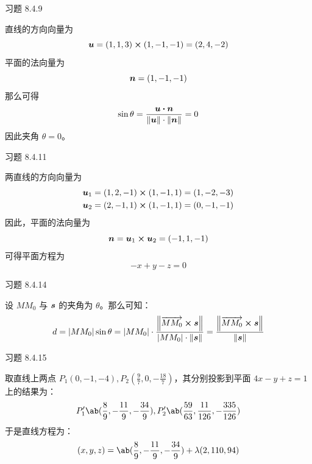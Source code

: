 \begin{problem}
	习题 8.4.9
	\begin{solution}
		直线的方向向量为
		$$
		\vect{u} = (1, 1, 3) \cp (1, -1, -1) = (2, 4, -2)
		$$
		平面的法向量为
		$$
		\boldsymbol{n} = (1, -1, -1)
		$$
		那么可得
		$$
		\sin \theta = \frac{\vect{u} \vdot \vect{n}}{\norm{\vect{u}} \cdot \norm{\vect{n}}} = 0
		$$
		因此夹角 $\theta = 0$。
	\end{solution}
\end{problem}

\begin{problem}
	习题 8.4.11
	\begin{solution}
		两直线的方向向量为
		$$
		\begin{gathered}
			\vect{u}_1 = (1, 2, -1) \cp (1, -1, 1) = (1, -2, -3) \\
			\vect{u}_2 = (2, -1, 1) \cp (1, -1, 1) = (0, -1, -1)
		\end{gathered}
		$$
		因此，平面的法向量为
		$$
		\vect{n} = \vect{u}_1 \cp \vect{u}_2 = (-1, 1, -1)
		$$
		可得平面方程为
		$$
		-x + y - z = 0
		$$
	\end{solution}
\end{problem}

\begin{problem}
	习题 8.4.14
	\begin{solution}
		设 $M M_0$ 与 $\boldsymbol{s}$ 的夹角为 $\theta$。那么可知：
		$$
		d = \abs{M M_0} \sin \theta = \abs{M M_0} \cdot \frac{\norm{\overrightarrow{M M_0} \cp \vect{s}}}{\abs{M M_0} \cdot \norm{\vect{s}}} = \frac{\norm{\overrightarrow{M M_0} \cp \vect{s}}}{\norm{\vect{s}}}
		$$
	\end{solution}
\end{problem}

\begin{problem}
    习题 8.4.15
    \begin{solution}
        取直线上两点 $P_1(0, -1, -4), P_2(\frac{9}{7}, 0, -\frac{18}{7})$，其分别投影到平面 $4x - y + z = 1$ 上的结果为：
		$$
		P_1'\ab(\frac{8}{9}, -\frac{11}{9}, -\frac{34}{9}), P_2'\ab(\frac{59}{63}, \frac{11}{126}, -\frac{335}{126})
		$$
		于是直线方程为：
		$$
		(x, y, z) = \ab(\frac{8}{9}, -\frac{11}{9}, -\frac{34}{9}) + \lambda (2, 110, 94)
		$$
    \end{solution}
\end{problem}